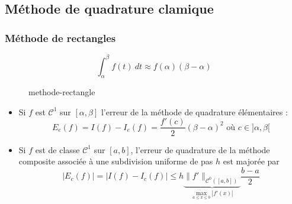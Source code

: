 \subsection{Méthode de quadrature clamique}
\subsubsection*{Méthode de rectangles}
\begin{definition}
    \[
    \int_{{\alpha}}^{{\beta}} {f(t)} \: d{t} \approx f(\alpha)(\beta - \alpha)
    \] 
\begin{figure}[H]
    \centering
    \caption{methode-rectangle}
    \label{fig:methode-rectangle}
\end{figure}
\end{definition}
\begin{prop}
    \begin{itemize}
        \item 
            Si $f$ est  $\mathcal{C}^{1}$ sur  $[\alpha, \beta]$ l'erreur de la méthode de quadrature élémentaires :
            \[
                E_e(f) = I(f) - I_e(f) = \frac{f'(c)}{2}(\beta - \alpha )^2 \text{ où } c \in ]\alpha, \beta[
            \] 
        \item Si $f$ est de classe  $\mathcal{C}^1$ sur  $[a, b]$, l'erreur de quadrature de la méthode composite associée à une subdivision uniforme de pas  $h$ est majorée par 
             \[
                 \left| E_c(f) \right| = \left| I(f) - I_c(f) \right| \le h \underbrace{\|f'\|_{\mathcal{C}^0([a, b])}}_{\max_{a \le x \le b}|f'(x)|} \frac{b - a}{2}
            \] 
    \end{itemize}
\end{prop}
